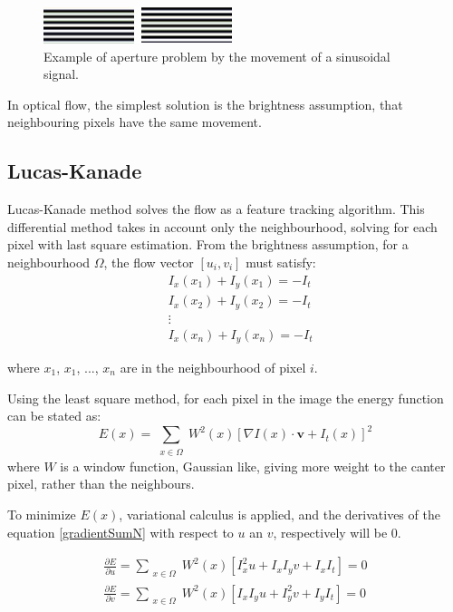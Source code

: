 \documentclass[12pt,a4paper,twoside]{report}
\begin{document}
{\begin{figure}
	\label{apertureimgSin}
	\centering
	\includegraphics{img/sin}
	\caption{Example of aperture problem by the movement of a sinusoidal signal.}
\end{figure}


In optical flow, the simplest solution is the brightness assumption, that neighbouring pixels have the same movement.

\subsection{Lucas-Kanade}
Lucas-Kanade method \cite{lucas1981} solves the flow as a feature tracking algorithm. This differential method takes in account only the neighbourhood, solving for each pixel with last square estimation. From the brightness assumption, for a neighbourhood $\Omega$, the flow vector $[u_i,v_i]$ must satisfy: 
\begin{equation}
\begin{split}
	&I_x(x_1)+I_y(x_1) = - I_t	\\
	&I_x(x_2)+I_y(x_2) = - I_t \\
	&\vdots \\
	&I_x(x_n)+I_y(x_n) = - I_t 
	\end{split}
\end{equation} 

where $x_1$, $x_1$,  $...$,  $x_n$ are in the neighbourhood of pixel $i$.

Using the least square method, for each pixel in the image the energy function can be stated as:
\begin{equation} \label{gradientSumN}
	E(x) = \sum_{\substack{x \in \Omega}}
	 W^2(x)[\nabla I(x)\cdot \boldsymbol{v}+I_t(x)]^2
\end{equation}
where $W$ is a window function, Gaussian like, giving more weight to the canter pixel, rather than the neighbours.

To minimize $E(x)$, variational calculus is applied, and the derivatives of the equation \ref{gradientSumN} with respect to $u$ an $v$, respectively will be 0.

\begin{equation}
	\begin{split}
	\frac{\partial E}{\partial u} =  \sum_{\substack{x \in \Omega}}
	W^2(x)[I_x^2 u + I_x I_y v + I_x I_t] = 0 \\ 
	\frac{\partial E}{\partial v} =  \sum_{\substack{x \in \Omega}}
	W^2(x)[ I_x I_y u + I_y^2 v + I_y I_t]  = 0
	\end{split}
\end{equation}

}
\end{document}
